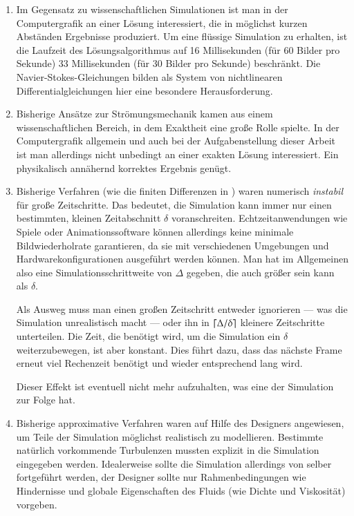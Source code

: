 \begin{enumerate}
\item
Im Gegensatz zu wissenschaftlichen Simulationen ist man in der
Computergrafik an einer Lösung interessiert, die in möglichst kurzen
Abständen Ergebnisse produziert. Um eine flüssige Simulation zu
erhalten, ist die Laufzeit des Lösungsalgorithmus auf 16 Millisekunden
(für 60 Bilder pro Sekunde) \Pimiddybzw{} 33 Millisekunden (für 30
Bilder pro Sekunde) beschränkt. Die Navier-Stokes-Gleichungen bilden
als System von nichtlinearen Differentialgleichungen hier eine
besondere Herausforderung.
\item
Bisherige Ansätze zur Strömungsmechanik kamen aus einem
wissenschaftlichen Bereich, in dem Exaktheit eine große Rolle
spielte. In der Computergrafik allgemein und auch bei der
Aufgabenstellung dieser Arbeit ist man allerdings nicht unbedingt an
einer exakten Lösung interessiert.  Ein physikalisch annähernd
korrektes Ergebnis genügt.
\item
Bisherige Verfahren (wie \PimiddyzB{} die finiten Differenzen in
\cite{Foster1997}) waren numerisch \emph{instabil} für große
Zeitschritte. Das bedeutet, die Simulation kann immer nur einen
bestimmten, kleinen Zeitabschnitt $\delta$ voranschreiten.
Echtzeitanwendungen wie Spiele oder Animationssoftware können
allerdings keine minimale Bildwiederholrate garantieren, da sie mit
verschiedenen Umgebungen und Hardwarekonfigurationen ausgeführt werden
können. Man hat im Allgemeinen also eine Simulationsschrittweite von
$\Delta$ gegeben, die auch größer sein kann als $\delta$.

Als Ausweg muss man einen großen Zeitschritt entweder ignorieren ---
was die Simulation unrealistisch macht --- oder ihn in
$\lceil{} \Delta / \delta \rceil{}$ kleinere Zeitschritte
unterteilen. Die Zeit, die benötigt wird, um die Simulation ein
$\delta$ weiterzubewegen, ist aber konstant. Dies führt dazu, dass das
nächste Frame erneut viel Rechenzeit benötigt und wieder entsprechend
lang wird.

Dieser Effekt ist eventuell nicht mehr aufzuhalten, was eine
 der Simulation zur Folge hat.
\item Bisherige approximative Verfahren waren auf Hilfe des Designers
angewiesen, um Teile der Simulation möglichst realistisch zu
modellieren. Bestimmte natürlich vorkommende Turbulenzen mussten
explizit in die Simulation eingegeben werden. Idealerweise sollte die
Simulation allerdings von selber fortgeführt werden, der Designer
sollte nur Rahmenbedingungen wie Hindernisse und globale Eigenschaften
des Fluids (wie Dichte und Viskosität) vorgeben.
\end{enumerate}

